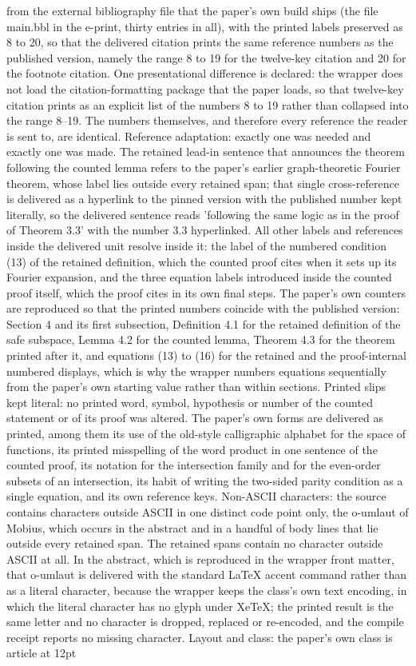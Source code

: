 \documentclass[10pt,a4paper]{amsart}
\theoremstyle{definition}
\begin{document}
from the external bibliography file that the paper's own build ships (the file main.bbl in the e-print, thirty entries in all), with the printed labels preserved as 8 to 20, so that the delivered citation prints the same reference numbers as the published version, namely the range 8 to 19 for the twelve-key citation and 20 for the footnote citation. One presentational difference is declared: the wrapper does not load the citation-formatting package that the paper loads, so that twelve-key citation prints as an explicit list of the numbers 8 to 19 rather than collapsed into the range 8--19. The numbers themselves, and therefore every reference the reader is sent to, are identical. Reference adaptation: exactly one was needed and exactly one was made. The retained lead-in sentence that announces the theorem following the counted lemma refers to the paper's earlier graph-theoretic Fourier theorem, whose label lies outside every retained span; that single cross-reference is delivered as a hyperlink to the pinned version with the published number kept literally, so the delivered sentence reads 'following the same logic as in the proof of Theorem 3.3' with the number 3.3 hyperlinked. All other labels and references inside the delivered unit resolve inside it: the label of the numbered condition (13) of the retained definition, which the counted proof cites when it sets up its Fourier expansion, and the three equation labels introduced inside the counted proof itself, which the proof cites in its own final steps. The paper's own counters are reproduced so that the printed numbers coincide with the published version: Section 4 and its first subsection, Definition 4.1 for the retained definition of the safe subspace, Lemma 4.2 for the counted lemma, Theorem 4.3 for the theorem printed after it, and equations (13) to (16) for the retained and the proof-internal numbered displays, which is why the wrapper numbers equations sequentially from the paper's own starting value rather than within sections. Printed slips kept literal: no printed word, symbol, hypothesis or number of the counted statement or of its proof was altered. The paper's own forms are delivered as printed, among them its use of the old-style calligraphic alphabet for the space of functions, its printed misspelling of the word product in one sentence of the counted proof, its notation for the intersection family and for the even-order subsets of an intersection, its habit of writing the two-sided parity condition as a single equation, and its own reference keys. Non-ASCII characters: the source contains characters outside ASCII in one distinct code point only, the o-umlaut of Mobius, which occurs in the abstract and in a handful of body lines that lie outside every retained span. The retained spans contain no character outside ASCII at all. In the abstract, which is reproduced in the wrapper front matter, that o-umlaut is delivered with the standard LaTeX accent command rather than as a literal character, because the wrapper keeps the class's own text encoding, in which the literal character has no glyph under XeTeX; the printed result is the same letter and no character is dropped, replaced or re-encoded, and the compile receipt reports no missing character. Layout and class: the paper's own class is article at 12pt 
\end{document}
